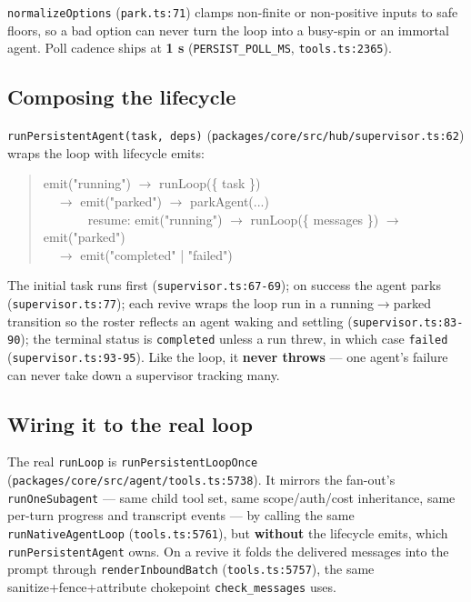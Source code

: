 \documentclass[11pt]{article}
\begin{document}
\texttt{normalizeOptions} (\texttt{park.ts:71}) clamps non-finite or non-positive
inputs to safe floors, so a bad option can never turn the loop into a busy-spin or
an immortal agent. Poll cadence ships at \textbf{1 s} (\texttt{PERSIST\_POLL\_MS},
\texttt{tools.ts:2365}).

\subsection{Composing the lifecycle}

\texttt{runPersistentAgent(task, deps)}
(\texttt{packages/core/src/hub/supervisor.ts:62}) wraps the loop with lifecycle
emits:

\begin{quote}
\ttfamily
emit("running") $\rightarrow$ runLoop(\{ task \})\\
\ \ $\rightarrow$ emit("parked") $\rightarrow$ parkAgent(...)\\
\ \ \ \ \ \ \ resume: emit("running") $\rightarrow$ runLoop(\{ messages \}) $\rightarrow$ emit("parked")\\
\ \ $\rightarrow$ emit("completed" | "failed")
\end{quote}

The initial task runs first (\texttt{supervisor.ts:67-69}); on success the agent
parks (\texttt{supervisor.ts:77}); each revive wraps the loop run in a
running$\rightarrow$parked transition so the roster reflects an agent waking and
settling (\texttt{supervisor.ts:83-90}); the terminal status is \texttt{completed}
unless a run threw, in which case \texttt{failed} (\texttt{supervisor.ts:93-95}).
Like the loop, it \textbf{never throws} --- one agent's failure can never take down
a supervisor tracking many.

\subsection{Wiring it to the real loop}

The real \texttt{runLoop} is \texttt{runPersistentLoopOnce}
(\texttt{packages/core/src/agent/tools.ts:5738}). It mirrors the fan-out's
\texttt{runOneSubagent} --- same child tool set, same scope/auth/cost inheritance,
same per-turn progress and transcript events --- by calling the same
\texttt{runNativeAgentLoop} (\texttt{tools.ts:5761}), but \textbf{without} the
lifecycle emits, which \texttt{runPersistentAgent} owns. On a revive it folds the
delivered messages into the prompt through \texttt{renderInboundBatch}
(\texttt{tools.ts:5757}), the same sanitize+fence+attribute chokepoint
\texttt{check\_messages} uses.
\end{document}
